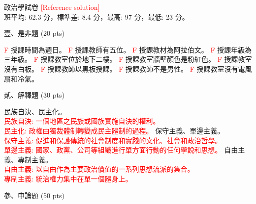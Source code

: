 \documentclass[14pt,a4paper,addpoints]{exam}
\begin{document}
    \begin{center}
    \fontsize{15pt}{15pt}\selectfont
    政治學試卷 \textcolor{red}{[Reference solution]} \\
    \vspace{0.1cm}
    班平均: 62.3 分，標準差: 8.4 分，最高: 97 分，最低: 23 分。\\
    \end{center}
    \vspace{0.3cm}
    \fontsize{14pt}{14pt}\selectfont
    壹、是非題 (20 pts)
    \begin{questions}
    \question[2] \textcolor{red}{F} 授課時間為週日。
    \question[2] \textcolor{red}{F} 授課教師有五位。 
    \question[2] \textcolor{red}{F} 授課教材為阿拉伯文。
    \question[2] \textcolor{red}{F} 授課年級為三年級。
    \question[2] \textcolor{red}{F} 授課教室位於地下二樓。
    \question[2] \textcolor{red}{F} 授課教室牆壁顏色是粉紅色。
    \question[2] \textcolor{red}{F} 授課教室沒有白板。
    \question[2] \textcolor{red}{F} 授課教師以黑板授課。
    \question[2] \textcolor{red}{F} 授課教師不是男性。
    \question[2] \textcolor{red}{F} 授課教室沒有電風扇和冷氣。
    \end{questions}
    \vspace{1.5cm}
    貳、解釋題 (30 pts)
    \begin{questions}
    \question[10] 民族自決、民主化。
    \textcolor{red}{
        \\
        民族自決: 一個地區之民族或國族實施自決的權利。 \\
        民主化: 政權由獨裁體制轉變成民主體制的過程。
    }
    \question[10] 保守主義、單邊主義。
    \textcolor{red}{
        \\
        保守主義: 促進和保護傳統的社會制度和實踐的文化、社會和政治哲學。 \\
        單邊主義: 國家、政黨、公司等組織進行單方面行動的任何學說和思想。
    }
    \question[10] 自由主義、專制主義。
    \textcolor{red}{
        \\
        自由主義: 以自由作為主要政治價值的一系列思想流派的集合。 \\
        專制主義: 統治權力集中在單一個體身上。
    }
    \end{questions}
    \vspace{1.5cm}
    參、申論題 (50 pts)
\end{document}
